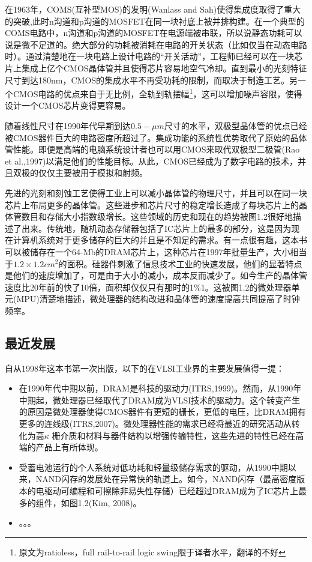 \documentclass[cn,11pt,chinese]{elegantbook}
\begin{document}
在1963年，COMS(互补型MOS)的发明(Wanlass and Sah)使得集成度取得了重大的突破,此时n沟道和p沟道的MOSFET在同一块衬底上被并排构建。在一个典型的COMS电路中，n沟道和p沟道的MOSFET在电源端被串联，所以说静态功耗可以说是微不足道的。绝大部分的功耗被消耗在电路的开关状态（比如仅当在动态电路时）。通过清楚地在一块电路上设计电路的“开关活动”，工程师已经可以在一块芯片上集成上亿个CMOS晶体管并且使得芯片容易地空气冷却。直到最小的光刻特征尺寸到达180nm，CMOS的集成水平不再受功耗的限制，而取决于制造工艺。另一个CMOS电路的优点来自于无比例，全轨到轨摆幅\footnote{原文为ratioless，full rail-to-rail logic swing限于译者水平，翻译的不好}，这可以增加噪声容限，使得设计一个CMOS芯片变得更容易。


随着线性尺寸在1990年代早期到达$0.5-\mu m$尺寸的水平，双极型晶体管的优点已经被CMOS器件巨大的电路密度所超过了。集成功能的系统性优势取代了原始的晶体管性能。即便是高端的电脑系统设计者也可以用CMOS来取代双极型二极管(Rao et al.,1997)以满足他们的性能目标。从此，CMOS已经成为了数字电路的技术，并且双极的仅仅主要被用于模拟和射频。

先进的光刻和刻蚀工艺使得工业上可以减小晶体管的物理尺寸，并且可以在同一块芯片上布局更多的晶体管。这些进步和芯片尺寸的稳定增长造成了每块芯片上的晶体管数目和存储大小指数级增长。这些领域的历史和现在的趋势被图1.2很好地描述了出来。传统地，随机动态存储器包括了IC芯片上的最多的部分，这是因为现在计算机系统对于更多储存的巨大的并且是不知足的需求。有一点很有趣，这本书可以被储存在一个64-Mb的DRAM芯片上，这种芯片在1997年批量生产，大小相当于$1.2\times 1.2cm^2$的面积。硅器件刺激了信息技术工业的快速发展，他们的显著特点是他们的速度增加了，可是由于大小的减小，成本反而减少了。如今生产的晶体管速度比20年前的快了10倍，面积却仅仅只有那时的1\%1。这被图1.2的微处理器单元(MPU)清楚地描述，微处理器的结构改进和晶体管的速度提高共同提高了时钟频率。

\subsection{最近发展}
自从1998年这本书第一次出版，以下的在VLSI工业界的主要发展值得一提：
\begin{itemize}
	\item 在1990年代中期以前，DRAM是科技的驱动力(ITRS,1999)。然而，从1990年中期起，微处理器已经取代了DRAM成为VLSI技术的驱动力。这个转变产生的原因是微处理器使得CMOS器件有更短的栅长，更低的电压，比DRAM拥有更多的连线级(ITRS,2007)。微处理器性能的需求已经将最近的研究活动从转化为高$\kappa$ 栅介质和材料与器件结构以增强传输特性，这些先进的特性已经在高端的产品上有所体现。
	
	\item 受蓄电池运行的个人系统对低功耗和轻量级储存需求的驱动，从1990中期以来，NAND闪存的发展处在异常快的轨道上。如今，NAND闪存（最高密度版本的电驱动可编程和可擦除非易失性存储）已经超过DRAM成为了IC芯片上最多的组件，如图1.2(Kim, 2008)。
	
	\item 。。。
\end{itemize}
\end{document}
